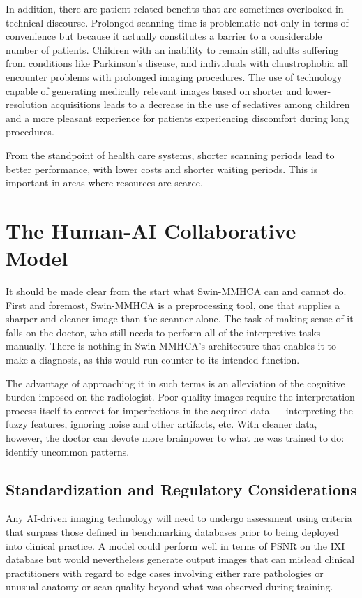 In addition, there are patient-related benefits that are sometimes overlooked in technical discourse. Prolonged scanning time is problematic not only in terms of convenience but because it actually constitutes a barrier to a considerable number of patients. Children with an inability to remain still, adults suffering from conditions like Parkinson's disease, and individuals with claustrophobia all encounter problems with prolonged imaging procedures. The use of technology capable of generating medically relevant images based on shorter and lower-resolution acquisitions leads to a decrease in the use of sedatives among children and a more pleasant experience for patients experiencing discomfort during long procedures.

From the standpoint of health care systems, shorter scanning periods lead to better performance, with lower costs and shorter waiting periods. This is important in areas where resources are scarce.

\section{The Human-AI Collaborative Model}
It should be made clear from the start what Swin-MMHCA can and cannot do. First and foremost, Swin-MMHCA is a preprocessing tool, one that supplies a sharper and cleaner image than the scanner alone. The task of making sense of it falls on the doctor, who still needs to perform all of the interpretive tasks manually. There is nothing in Swin-MMHCA's architecture that enables it to make a diagnosis, as this would run counter to its intended function.

The advantage of approaching it in such terms is an alleviation of the cognitive burden imposed on the radiologist. Poor-quality images require the interpretation process itself to correct for imperfections in the acquired data — interpreting the fuzzy features, ignoring noise and other artifacts, etc. With cleaner data, however, the doctor can devote more brainpower to what he was trained to do: identify uncommon patterns.

\subsection{Standardization and Regulatory Considerations}
Any AI-driven imaging technology will need to undergo assessment using criteria that surpass those defined in benchmarking databases prior to being deployed into clinical practice. A model could perform well in terms of PSNR on the IXI database but would nevertheless generate output images that can mislead clinical practitioners with regard to edge cases involving either rare pathologies or unusual anatomy or scan quality beyond what was observed during training.

